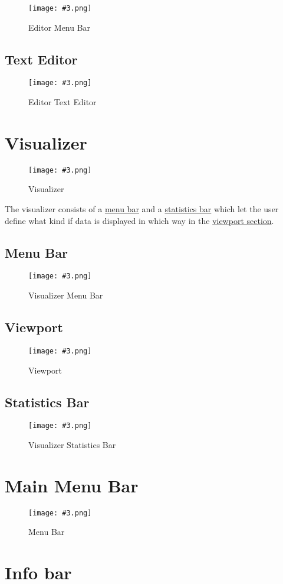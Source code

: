 \documentclass[10pt,a4paper]{report}
\newcommand{\refer}[2]{\hyperref[#1]{\textcolor{col:reference}{#2}}}
\newcommand{\h}[1]{\textcolor{col:highlight}{#1}}
\newcommand{\includeimage}[5]{
    \begin{figure}[H]
        #1
        \texttt{[image: \#3.png]}
        \caption{#4}
        \label{fig:#5}
    \end{figure}
}
\begin{document}
\includeimage{}{0.4}{Editor Menu Bar}{Editor Menu Bar}{editor_menu_bar}

\subsection{Text Editor}
\label{sec:editor:text_editor}

\includeimage{}{0.4}{Editor Text Editor}{Editor Text Editor}{editor_text_editor}

\section{Visualizer}
\includeimage{}{0.4}{Visualizer}{Visualizer}{visualizer}
\label{sec:visualizer}
The \h{visualizer} consists of a \refer{sec:visualizer:menu}{menu bar} and a \refer{sec:visualizer:statistics}{statistics bar} which let the user define what kind if data is displayed in which way in the \refer{sec:visualizer:viewport}{viewport section}.


\subsection{Menu Bar}
\label{sec:visualizer:menu}

\includeimage{}{0.4}{Visualizer Menu Bar}{Visualizer Menu Bar}{visualizer_menu_bar}

\subsection{Viewport}
\label{sec:visualizer:viewport}

\includeimage{}{0.4}{Viewport}{Viewport}{viewport}

\subsection{Statistics Bar}
\label{sec:visualizer:statistics}

\includeimage{}{0.4}{Visualizer Statistics Bar}{Visualizer Statistics Bar}{visualizer_statistics_bar}

\section{Main Menu Bar}
\label{sec:menu}

\includeimage{}{0.4}{Menu Bar}{Menu Bar}{menu_bar}

\section{Info bar}
\label{sec:info}
\end{document}
